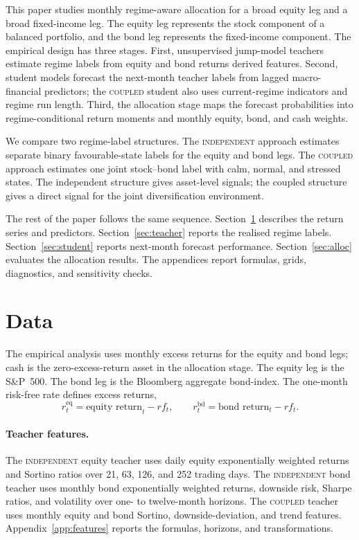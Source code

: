 \documentclass[10pt]{article}
\newcommand{\Acoup}{\textsc{coupled}}
\newcommand{\Bindep}{\textsc{independent}}
\begin{document}
This paper studies monthly regime-aware allocation for a broad equity leg and a broad fixed-income leg. The equity leg represents the stock component of a balanced portfolio, and the bond leg represents the fixed-income component. The empirical design has three stages. First, unsupervised jump-model teachers estimate regime labels from equity and bond returns derived features.
Second, student models forecast the next-month teacher labels from lagged macro-financial
predictors; the \Acoup{} student also uses current-regime indicators and regime run length. Third, the allocation stage maps
the forecast probabilities into regime-conditional return moments and monthly equity, bond,
and cash weights.

We compare two regime-label structures. The \Bindep{} approach estimates separate binary
favourable-state labels for the equity and bond legs. The \Acoup{} approach estimates one
joint stock--bond label with calm, normal, and stressed states. The independent structure
gives asset-level signals; the coupled structure gives a direct signal for the joint
diversification environment.

The rest of the paper follows the same sequence. Section~\ref{sec:data} describes the return
series and predictors. Section~\ref{sec:teacher} reports the realised regime labels.
Section~\ref{sec:student} reports next-month forecast performance. Section~\ref{sec:alloc}
evaluates the allocation results. The appendices report formulas, grids, diagnostics, and
sensitivity checks.

\section{Data}
\label{sec:data}

The empirical analysis uses monthly excess returns for the equity and bond legs; cash is the zero-excess-return asset in the allocation stage.
The equity leg is the S\&P~500. The bond leg is the Bloomberg aggregate bond-index.
The one-month risk-free rate defines excess returns,
\[
    r^{\mathrm{eq}}_t=\text{equity return}_t-rf_t,\qquad
    r^{\mathrm{bd}}_t=\text{bond return}_t-rf_t .
\]

\paragraph{Teacher features.}
The \Bindep{} equity teacher uses daily equity exponentially weighted returns and Sortino
ratios over 21, 63, 126, and 252 trading days. The \Bindep{} bond teacher uses monthly bond
exponentially weighted returns, downside risk, Sharpe ratios, and volatility over one- to
twelve-month horizons. The \Acoup{} teacher uses monthly equity and bond Sortino, downside-deviation,
and trend features. Appendix~\ref{app:features} reports the formulas, horizons, and
transformations.
\end{document}
